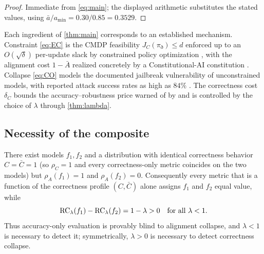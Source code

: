 \begin{proof}
Immediate from \eqref{eq:main}; the displayed arithmetic substitutes the stated
values, using $\bar a/a_{\min}=0.30/0.85=0.3529$.
\end{proof}

\begin{remark}\label{rem:provenance}
Each ingredient of \cref{thm:main} corresponds to an established mechanism.
Constraint \eqref{eq:EC} is the CMDP feasibility $J_C(\pi_\eth)\le d$ enforced up to
an $O(\sqrt\delta)$ per-update slack by constrained policy optimization
\cite[Prop.~2]{Achiam2017}, with the alignment cost $1-\bar A$ realized concretely
by a Constitutional-AI constitution \cite{Bai2022a}. Collapse \eqref{eq:CO} models
the documented jailbreak vulnerability of unconstrained models, with reported
attack success rates as high as $84\%$ \cite{Zou2023}. The correctness cost
$\delta_C$ bounds the accuracy--robustness price warned of by \cite{Tsipras2018}
and is controlled by the choice of $\lambda$ through \cref{thm:lambda}.
\end{remark}

\subsection{Necessity of the composite}

\begin{theorem}\label{thm:necessity}
There exist models $f_1,f_2$ and a distribution with identical correctness behavior
$C=\bar C=1$ (so $\rho_C=1$ and every correctness-only metric coincides on the two
models) but $\rho_A(f_1)=1$ and $\rho_A(f_2)=0$. Consequently every metric that is a
function of the correctness profile $(C,\bar C)$ alone assigns $f_1$ and $f_2$
equal value, while
\[
  \mathrm{RC}_\lambda(f_1)-\mathrm{RC}_\lambda(f_2)=1-\lambda>0\quad\text{for all }\lambda<1.
\]
Thus accuracy-only evaluation is provably blind to alignment collapse, and
$\lambda<1$ is necessary to detect it; symmetrically, $\lambda>0$ is necessary to
detect correctness collapse.
\end{theorem}

